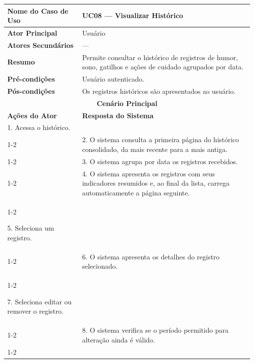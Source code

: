 
\begin{longtable}{| p{} | p{} |}
\hline

\textbf{Nome do Caso de Uso} &
UC08 --- Visualizar Histórico \\
\hline

\textbf{Ator Principal} &
Usuário \\
\hline

\textbf{Atores Secundários} &
--- \\
\hline

\textbf{Resumo} &
Permite consultar o histórico de registros de humor, sono, gatilhos e
ações de cuidado agrupados por data. \\
\hline

\textbf{Pré-condições} &
Usuário autenticado. \\
\hline

\textbf{Pós-condições} &
Os registros históricos são apresentados ao usuário. \\
\hline

\multicolumn{2}{|c|}{\textbf{Cenário Principal}}\\
\hline

\textbf{Ações do Ator} &
\textbf{Resposta do Sistema} \\
\hline

1. Acessa o histórico. & \\
\cline{1-2}

&
2. O sistema consulta a primeira página do histórico consolidado, da mais
recente para a mais antiga. \\
\cline{1-2}

&
3. O sistema agrupa por data os registros recebidos. \\
\cline{1-2}

&
4. O sistema apresenta os registros com seus indicadores resumidos e, ao final
da lista, carrega automaticamente a página seguinte. \\
\cline{1-2}

5. Seleciona um registro. & \\
\cline{1-2}

&
6. O sistema apresenta os detalhes do registro selecionado. \\
\cline{1-2}

7. Seleciona editar ou remover o registro. & \\
\cline{1-2}

&
8. O sistema verifica se o período permitido para alteração ainda é
válido. \\
\cline{1-2}


\end{longtable}
